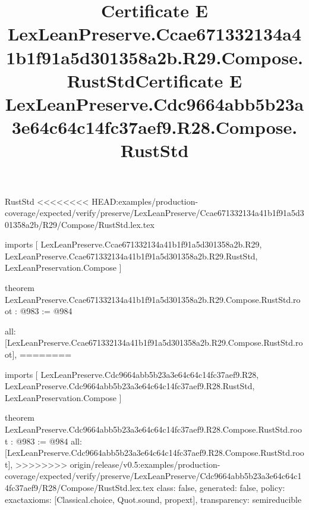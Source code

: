 \begin{lexlean}{RustStd}
<<<<<<<< HEAD:examples/production-coverage/expected/verify/preserve/LexLeanPreserve/Ccae671332134a41b1f91a5d301358a2b/R29/Compose/RustStd.lex.tex
\title{Certificate E LexLeanPreserve.Ccae671332134a41b1f91a5d301358a2b.R29.Compose.RustStd}
\begin{coremodule}
imports [
  LexLeanPreserve.Ccae671332134a41b1f91a5d301358a2b.R29,
  LexLeanPreserve.Ccae671332134a41b1f91a5d301358a2b.R29.RustStd,
  LexLeanPreservation.Compose
]

theorem LexLeanPreserve.Ccae671332134a41b1f91a5d301358a2b.R29.Compose.RustStd.root : @983 := @984 {
  all: [LexLeanPreserve.Ccae671332134a41b1f91a5d301358a2b.R29.Compose.RustStd.root],
========
\title{Certificate E LexLeanPreserve.Cdc9664abb5b23a3e64c64c14fc37aef9.R28.Compose.RustStd}
\begin{coremodule}
imports [
  LexLeanPreserve.Cdc9664abb5b23a3e64c64c14fc37aef9.R28,
  LexLeanPreserve.Cdc9664abb5b23a3e64c64c14fc37aef9.R28.RustStd,
  LexLeanPreservation.Compose
]

theorem LexLeanPreserve.Cdc9664abb5b23a3e64c64c14fc37aef9.R28.Compose.RustStd.root : @983 := @984 {
  all: [LexLeanPreserve.Cdc9664abb5b23a3e64c64c14fc37aef9.R28.Compose.RustStd.root],
>>>>>>>> origin/release/v0.5:examples/production-coverage/expected/verify/preserve/LexLeanPreserve/Cdc9664abb5b23a3e64c64c14fc37aef9/R28/Compose/RustStd.lex.tex
  class: false,
  generated: false,
  policy: exact{axioms: [Classical.choice, Quot.sound, propext]},
  transparency: semireducible
}


\end{coremodule}}
\end{coremodule}
\end{lexlean}
